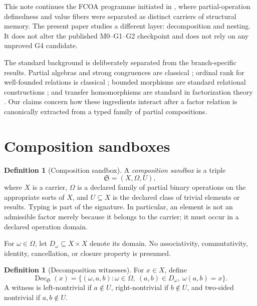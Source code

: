 \documentclass[11pt]{article}
\theoremstyle{definition}
\newtheorem{definition}[theorem]{Definition}
\theoremstyle{remark}
\newcommand{\Sbx}{\mathfrak S}
\newcommand{\Dec}{\operatorname{Dec}}
\begin{document}
This note continues the FCOA programme initiated in \cite{MalachevskyFCOA2026}, where partial-operation definedness and value fibers were separated as distinct carriers of structural memory. The present paper studies a different layer: decomposition and nesting. It does not alter the published M0--G1--G2 checkpoint and does not rely on any unproved G4 candidate.

The standard background is deliberately separated from the branch-specific results. Partial algebras and strong congruences are classical \cite{Gratzer1979,GratzerWenzel1967}; ordinal rank for well-founded relations is classical \cite{Jech2003}; bounded morphisms are standard relational constructions \cite{BlackburnDeRijkeVenema2001}; and transfer homomorphisms are standard in factorization theory \cite{GeroldingerHalterKoch2006}. Our claims concern how these ingredients interact after a factor relation is canonically extracted from a typed family of partial compositions.

\section{Composition sandboxes}

\begin{definition}[Composition sandbox]
A \emph{composition sandbox} is a triple
\begin{equation}
\Sbx=(X,\Omega,U),
\label{eq:sandbox}
\end{equation}
where \(X\) is a carrier, \(\Omega\) is a declared family of partial binary operations on the appropriate sorts of \(X\), and \(U\subseteq X\) is the declared class of trivial elements or results. Typing is part of the signature. In particular, an element is not an admissible factor merely because it belongs to the carrier; it must occur in a declared operation domain.
\end{definition}

For \(\omega\in\Omega\), let \(D_\omega\subseteq X\times X\) denote its domain. No associativity, commutativity, identity, cancellation, or closure property is presumed.

\begin{definition}[Decomposition witnesses]
For \(x\in X\), define
\begin{equation}
\Dec_{\Sbx}(x)=\{(\omega,a,b):\omega\in\Omega,\ (a,b)\in D_\omega,\ \omega(a,b)=x\}.
\label{eq:dec}
\end{equation}
A witness is left-nontrivial if \(a\notin U\), right-nontrivial if \(b\notin U\), and two-sided nontrivial if \(a,b\notin U\).
\end{definition}
\end{document}
